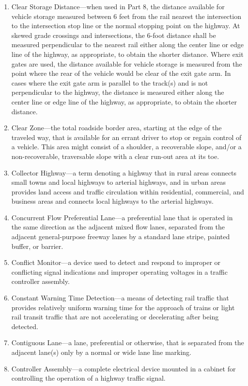 \documentclass[9pt]{memoir}
\begin{document}
{\begin{enumerate}[label=\arabic*., ref=\arabic*]
\item Clear Storage Distance---when used in Part 8, the distance available for vehicle storage measured between 6 feet from the rail nearest the intersection to the intersection stop line or the normal stopping point on the highway. At skewed grade crossings and intersections, the 6-foot distance shall be measured perpendicular to the nearest rail either along the center line or edge line of the highway, as appropriate, to obtain the shorter distance. Where exit gates are used, the distance available for vehicle storage is measured from the point where the rear of the vehicle would be clear of the exit gate arm. In cases where the exit gate arm is parallel to the track(s) and is not perpendicular to the highway, the distance is measured either along the center line or edge line of the highway, as appropriate, to obtain the shorter distance.
\item Clear Zone---the total roadside border area, starting at the edge of the traveled way, that is available for an errant driver to stop or regain control of a vehicle. This area might consist of a shoulder, a recoverable slope, and/or a non-recoverable, traversable slope with a clear run-out area at its toe.
\item Collector Highway---a term denoting a highway that in rural areas connects small towns and local highways to arterial highways, and in urban areas provides land access and traffic circulation within residential, commercial, and business areas and connects local highways to the arterial highways.
\item Concurrent Flow Preferential Lane---a preferential lane that is operated in the same direction as the adjacent mixed flow lanes, separated from the adjacent general-purpose freeway lanes by a standard lane stripe, painted buffer, or barrier.
\item Conflict Monitor---a device used to detect and respond to improper or conflicting signal indications and improper operating voltages in a traffic controller assembly.
\item Constant Warning Time Detection---a means of detecting rail traffic that provides relatively uniform warning time for the approach of trains or light rail transit traffic that are not accelerating or decelerating after being detected.
\item Contiguous Lane---a lane, preferential or otherwise, that is separated from the adjacent lane(s) only by a normal or wide lane line marking.
\item Controller Assembly---a complete electrical device mounted in a cabinet for controlling the operation of a highway traffic signal.

\end{enumerate}}
\end{document}
